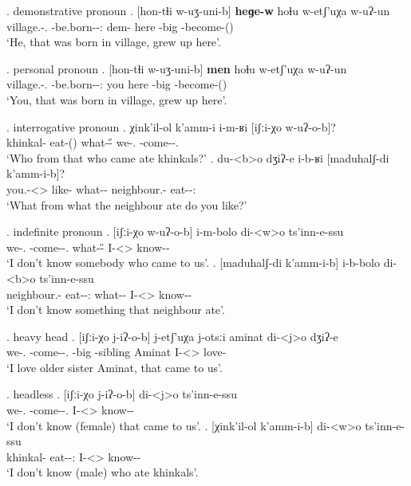 \ex. demonstrative pronoun
	\ag. [hon-tɬi w-uʒ-uni-b] \textbf{heɡe-w} hoɬu w-etʃ'uχa w-uʔ-un\\
			{village.\Obl-\Inter.\Ess} {\M-be.born-\Pst-\Ptcp:\Pst} {dem-\M} here {\M-big} {\M-become-\Pst(\Aor)}\\
			\glt `He, that was born in village, grew up here'.

\ex. personal pronoun
	\ag. [hon-tɬi w-uʒ-uni-b] \textbf{men} hoɬu w-etʃ'uχa w-uʔ-un\\
			{village.\Obl-\Inter.\Ess} {\M-be.born-\Pst-\Ptcp:\Pst} you here {\M-big} {\M-become-\Pst(\Aor)}\\
			\glt `You, that was born in village, grew up here'.
			
\ex. interrogative pronoun
	\ag. χink'il-ol k'amm-i i-m-ʁi [iʃːi-χo w-uʔ-o-b]?\\
			{khinkal-\Pl} {eat-\Pst(\Aor)} {what-\H-\Wh} {we-\Add.\Lat} {\M-come-\Pst-\Ptcp.\Pst}\\
			\glt `Who from that who came ate khinkals?'
	\bg. du-<b>o dʒiʔ-e i-b-ʁi [maduhalʃ-di k'amm-i-b]?\\
			{you.\Obl-<\Nanf>\Aff} {like-\Hab} {what-\Nh-\Wh} {neighbour.\Obl-\Erg} {eat-\Pst-\Ptcp:\Pst}\\
			\glt `What from what the neighbour ate do you like?'
		
\ex. indefinite pronoun
	\ag.  [iʃːi-χo w-uʔ-o-b] i-m-bolo di-<w>o  ts'inn-e-ssu\\
			{we-\Add.\Lat} {\M-come-\Pst-\Ptcp.\Pst} {what-\H-\Indef} {I-<\M>\Aff} {know-\Hab-\Neg}\\
			\glt `I don't know somebody who came to us'.
	\bg.  [maduhalʃ-di k'amm-i-b] i-b-bolo di-<b>o  ts'inn-e-ssu\\
			{neighbour.\Obl-\Erg} {eat-\Pst-\Ptcp:\Pst} {what-\Nh-\Indef} {I-<\Nanf>\Aff} {know-\Hab-\Neg}\\
			\glt `I don't know something that neighbour ate'.

\ex. heavy head
	\ag.  [iʃːi-χo j-iʔ-o-b] j-etʃ'uχa j-otsːi aminat di-<j>o dʒiʔ-e\\
			{we-\Add.\Lat} {\F-come-\Pst-\Ptcp.\Pst} {\F-big} {\F-sibling} Aminat {I-<\F>\Aff} {love-\Hab}\\
			\glt `I love older sister Aminat, that came to us'.

\ex. headless
	\ag.  [iʃːi-χo j-iʔ-o-b] di-<j>o ts'inn-e-ssu\\
			{we-\Add.\Lat} {\F-come-\Pst-\Ptcp.\Pst} {I-<\F>\Aff} {know-\Hab-\Neg}\\
			\glt `I don't know (female) that came to us'.
	\bg.  [χink'il-ol k'amm-i-b] di-<w>o ts'inn-e-ssu\\
			{khinkal-\Pl} {eat-\Pst-\Ptcp:\Pst} {I-<\M>\Aff} {know-\Hab-\Neg}\\
			\glt `I don't know (male) who ate khinkals'.

